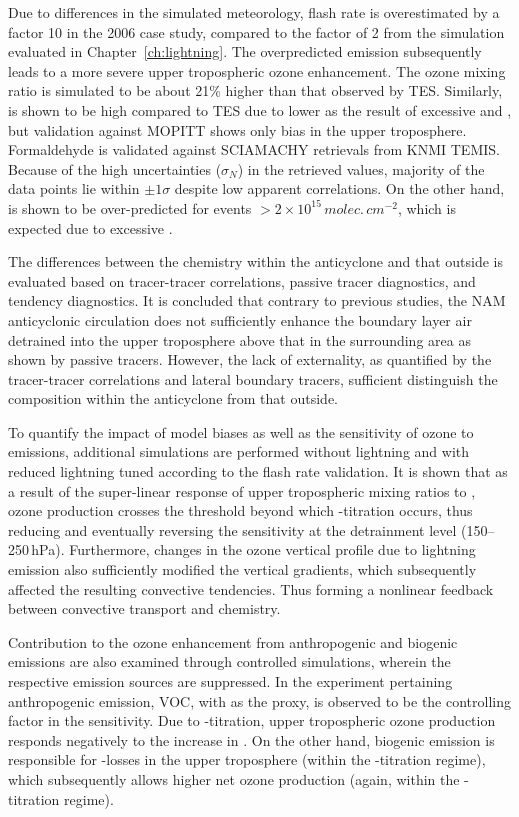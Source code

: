 Due to differences in the simulated meteorology, flash rate is overestimated by a factor 10 in the
2006 case study, compared to the factor of 2 from the simulation evaluated in  Chapter~\ref{ch:lightning}.
The overpredicted {\lnox} emission subsequently leads to a more severe upper tropospheric
ozone enhancement. The ozone mixing ratio is simulated to be about 21\% higher than that
observed by TES. Similarly,  is shown to be high compared to TES due to lower
 as the result of excessive  and , but validation
against MOPITT shows only bias in the upper troposphere. Formaldehyde is validated against SCIAMACHY retrievals
from KNMI TEMIS. Because of the high uncertainties ($\sigma_N$) in the retrieved values,
majority of the data points lie within $\pm1\sigma$ despite low apparent correlations. On the
other hand,  is shown to be over-predicted for events $>2\times10^{15}\,\unit{molec.\,cm^{-2}}$,
which is expected due to excessive {\lnox}.

The differences between the chemistry within the anticyclone and that outside is evaluated
based on tracer-tracer correlations, passive tracer diagnostics, and tendency diagnostics. It
is concluded that contrary to previous studies, the NAM anticyclonic circulation does not
sufficiently enhance the boundary layer air detrained into the upper troposphere above
that in the surrounding area as shown by passive tracers. However, the lack of externality, as quantified
by the tracer-tracer correlations and lateral boundary tracers, sufficient distinguish the
composition within the anticyclone from that outside.

To quantify the impact of model biases as well as the sensitivity of ozone to {\lnox} emissions,
additional simulations are performed without lightning and with reduced lightning tuned according
to the flash rate validation. It is shown that as a result of the super-linear response of upper
tropospheric  mixing ratios to {\lnox}, ozone production crosses the threshold
beyond which -titration occurs, thus reducing and eventually reversing the
sensitivity at the detrainment level (150--250\,\unit{hPa}). Furthermore, changes in the ozone
vertical profile due to lightning emission also sufficiently modified the vertical gradients, which
subsequently affected the resulting convective tendencies. Thus forming a nonlinear feedback
between convective transport and chemistry.

Contribution to the ozone enhancement from anthropogenic and biogenic emissions are also examined
through controlled simulations, wherein the respective emission sources are suppressed. In the
experiment pertaining anthropogenic emission, VOC, with  as the proxy, is observed
to be the controlling factor in the sensitivity. Due to -titration, upper tropospheric
ozone production responds negatively to the increase in . On the other hand, biogenic
emission is responsible for -losses in the upper troposphere (within the
-titration regime), which subsequently allows higher net ozone production (again,
within the -titration regime).


